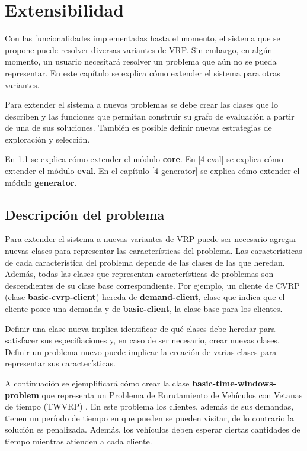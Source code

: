 \chapter{Extensibilidad}\label{chapter:Extension}

Con las funcionalidades implementadas hasta el momento, el sistema que se propone puede resolver diversas variantes de VRP. Sin embargo, en algún momento, un usuario necesitará resolver un problema que aún no se pueda representar. En este capítulo se explica cómo extender el sistema para otras variantes.

Para extender el sistema a nuevos problemas se debe crear las clases que lo describen y las funciones que permitan construir su grafo de evaluación a partir de una de sus soluciones. También es posible definir nuevas estrategias de exploración y selección.

En \ref{4-description} se explica cómo extender el módulo \textbf{core}. En \ref{4-eval} se explica cómo extender el módulo \textbf{eval}. En el capítulo \ref{4-generator} se explica cómo extender el módulo \textbf{generator}.

\section{Descripción del problema}\label{4-description}
Para extender el sistema a nuevas variantes de VRP puede ser necesario agregar nuevas clases para representar las características del problema. Las características de cada característica del problema depende de las clases de las que heredan. Además, todas las clases que representan características de problemas son descendientes de su clase base correspondiente. Por ejemplo, un cliente de CVRP (clase \textbf{basic-cvrp-client}) hereda de \textbf{demand-client}, clase que indica que el cliente posee una demanda y de \textbf{basic-client}, la clase base para los clientes.

Definir una clase nueva implica identificar de qué clases debe heredar para satisfacer sus especifiaciones y, en caso de ser necesario, crear nuevas clases. Definir un problema nuevo puede implicar la creación de varias clases para representar sus características.

A continuación se ejemplificará cómo crear la clase \textbf{basic-time-windows-problem} que representa un Problema de Enrutamiento de Vehículos con Vetanas de tiempo (TWVRP) \cite{TODO}. En este problema los clientes, además de sus demandas, tienen un período de tiempo en que pueden se pueden visitar, de lo contrario la solución es penalizada. Además, los vehículos deben esperar ciertas cantidades de tiempo mientras atienden a cada cliente.

